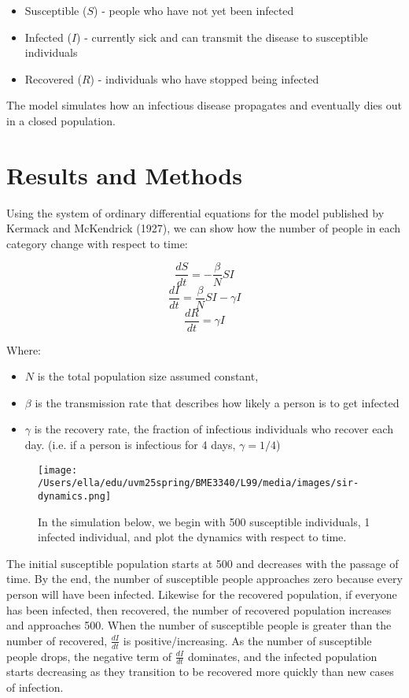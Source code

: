 \documentclass[12pt]{article}
\begin{document}
\begin{itemize}
  \item Susceptible (\(S\)) - people who have not yet been infected
  \item Infected (\(I\)) - currently sick and can transmit the disease to susceptible individuals
  \item Recovered (\(R\)) - individuals who have stopped being infected
\end{itemize}

The model simulates how an infectious disease propagates and eventually dies out in a closed population.

\newpage
\section*{Results and Methods}

Using the system of ordinary differential equations for the model published by Kermack and McKendrick (1927), we can show how the number of people in each category change with respect to time:

\[ \frac{dS}{dt} = -\frac{\beta}{N} SI\]
\[ \frac{dI}{dt} = \frac{\beta}{N} SI - \gamma I\]
\[\frac{dR}{dt} = \gamma I\]

Where:

\begin{itemize}
\item \(N\) is the total population size assumed constant,
\item \(\beta\) is the transmission rate that describes how likely a person is to get infected
\item \(\gamma\) is the recovery rate, the fraction of infectious individuals who recover each day. (i.e. if a person is infectious for 4 days, \(\gamma = 1/4\))
\end{itemize}

\begin{figure}[h!]
        \centering
        \texttt{[image: /Users/ella/edu/uvm25spring/BME3340/L99/media/images/sir-dynamics.png]}
        \caption{In the simulation below, we begin with 500 susceptible individuals, 1 infected individual, and plot the dynamics with respect to time.}
        \label{fig:cg}
\end{figure}

The initial susceptible population starts at 500 and decreases with the passage of time. By the end, the number of susceptible people approaches zero because every person will have been infected. Likewise for the recovered population, if everyone has been infected, then recovered, the number of recovered population increases and approaches 500. When the number of susceptible people is greater than the number of recovered, \(\frac{dI}{dt}\) is positive/increasing. As the number of susceptible people drops, the negative term of \(\frac{dI}{dt}\) dominates, and the infected population starts decreasing as they transition to be recovered more quickly than new cases of infection.
\end{document}
